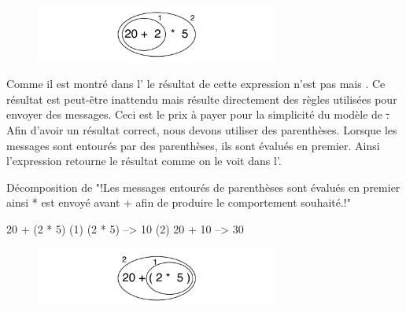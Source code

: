 \documentclass[a4paper,10pt,twoside]{book}
\begin{document}
\begin{figure}
\begin{center}\includegraphics[width=8cm]{ucompoNoBracketPar}\end{center}
\end{figure}
\noindent
Comme il est montr\'e dans l' le r\'esultat de cette expression n'est pas  mais . Ce r\'esultat est peut-\^etre inattendu mais r\'esulte directement des r\`egles utilis\'ees pour envoyer des messages. Ceci est le prix \`a payer pour la simplicit\'e du mod\`ele de \st. Afin d'avoir un r\'esultat correct, nous devons utiliser des parenth\`eses. Lorsque les messages sont entour\'es par des parenth\`eses, ils sont \'evalu\'es en premier. Ainsi l'expression  retourne le r\'esultat comme on le voit dans l'.

\begin{example}[mathcorrect]{D\'ecomposition de }{}
"!Les messages entour\'es de parenth\`eses sont \'evalu\'es en premier ainsi * est envoy\'e avant + afin de produire le comportement souhait\'e.!"

    20 + (2 * 5) 
(1)        (2 * 5) --> 10
(2) 20 + 10      --> 30
\end{example}

\begin{figure}
\begin{center}
\includegraphics[width=8cm]{ucompoNumberBracket}
\end{center}
\end{figure}


\end{document}
